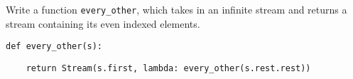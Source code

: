 \question Write a function \lstinline$every_other$, which takes in an infinite
stream and returns a stream containing its even indexed elements.

\begin{lstlisting}
def every_other(s):
\end{lstlisting}
\begin{solution}[2cm]
\begin{lstlisting}
    return Stream(s.first, lambda: every_other(s.rest.rest))
\end{lstlisting}
\end{solution}
